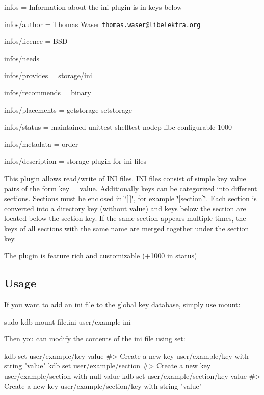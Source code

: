 
\begin{DoxyItemize}
\item infos = Information about the ini plugin is in keys below
\item infos/author = Thomas Waser \href{mailto:thomas.waser@libelektra.org}{\tt thomas.\+waser@libelektra.\+org}
\item infos/licence = B\+SD
\item infos/needs =
\item infos/provides = storage/ini
\item infos/recommends = binary
\item infos/placements = getstorage setstorage
\item infos/status = maintained unittest shelltest nodep libc configurable 1000
\item infos/metadata = order
\item infos/description = storage plugin for ini files
\end{DoxyItemize}

This plugin allows read/write of I\+NI files. I\+NI files consist of simple key value pairs of the form {\ttfamily key = value}. Additionally keys can be categorized into different sections. Sections must be enclosed in \char`\"{}\mbox{[}$\,$\mbox{]}\char`\"{}, for example \char`\"{}\mbox{[}section\mbox{]}\char`\"{}. Each section is converted into a directory key (without value) and keys below the section are located below the section key. If the same section appears multiple times, the keys of all sections with the same name are merged together under the section key.

The plugin is feature rich and customizable (+1000 in status)

\subsection*{Usage}

If you want to add an ini file to the global key database, simply use mount\+:


\begin{DoxyCode}
sudo kdb mount file.ini user/example ini
\end{DoxyCode}


Then you can modify the contents of the ini file using set\+:


\begin{DoxyCode}
kdb set user/example/key value
#> Create a new key user/example/key with string "value"
kdb set user/example/section
#> Create a new key user/example/section with null value
kdb set user/example/section/key value
#> Create a new key user/example/section/key with string "value"
\end{DoxyCode}


